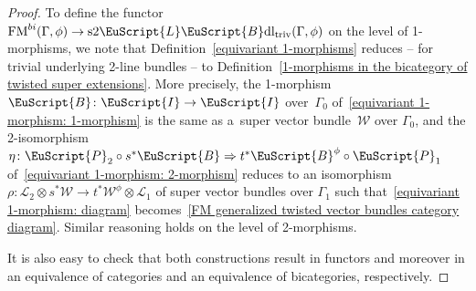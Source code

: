 \documentclass[10pt,a4paper]{amsart}
\numberwithin{equation}{section}
\def\mathscr#1{\EuScript{#1}}
\newcommand{\LineBdl}{\mathscr{L}\mathscr{B}\mathrm{dl}}
\newcommand{\stwoLineBdltriv}{\mathrm{s}2\LineBdl_{\mathrm{triv}}}
\begin{document}
\begin{proof}
 To define the functor $\mathrm{FM}^{bi}(\Gamma,\phi)\to \stwoLineBdltriv(\Gamma,\phi)$ on the level of 1-morphisms, we note that Definition~\ref{equivariant 1-morphisms}
 reduces -- for trivial underlying 2-line bundles -- to Definition~\ref{1-morphisms in the bicategory of twisted super extensions}. More precisely,
 the 1-morphism $\mathscr{B} \colon \mathscr{I} \to \mathscr{I}$ over~$\Gamma_0$ of~\eqref{equivariant 1-morphism: 1-morphism} is the same as a~super vector bundle~$\mathcal{W}$ over $\Gamma_0$, and the 2-isomorphism $\eta \colon \mathscr{P}_2 \circ s^*\mathscr{B} \Rightarrow t^*\mathscr{B}^\phi \circ \mathscr{P}_1$
 of~\eqref{equivariant 1-morphism: 2-morphism} reduces to an isomorphism~${\rho\colon \mathcal{L}_2 \otimes s^*\mathcal{W} \to t^*\mathcal{W}^\phi \otimes \mathcal{L}_1}$
 of super vector bundles over $\Gamma_1$ such that~\eqref{equivariant 1-morphism: diagram} becomes~\eqref{FM generalized twisted vector bundles category diagram}.
 Similar reasoning holds on the level of 2-morphisms.

 It is also easy to check that both constructions result in functors and moreover in an equivalence of categories and an equivalence of bicategories, respectively.
\end{proof}
\end{document}
